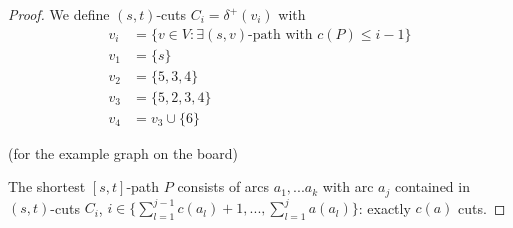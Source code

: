 \begin{proof}
	We define $(s, t)$-cuts $C_i = \delta^+(v_i)$ with
	\begin{align*}
		v_i & = \{v \in V: \exists \text{$(s,v)$-path with $c(P)\leq i-1$}\} \\
		v_1 & = \{s\} \\
		v_2 & = \{5,3,4\} \\
		v_3 & = \{5,2,3,4\} \\
		v_4 & = v_3 \cup \{ 6 \}
	\end{align*}
	
	(for the example graph on the board)
	
	The shortest $[s,t]$-path $P$ consists of arcs $a_1, ... a_k$ with arc $a_j$ contained in $(s,t)$-cuts $C_i$,  $i \in \{\sum_{l=1}^{j-1} c(a_l) + 1, ..., \sum_{l=1}^j a(a_l)\}$: exactly $c(a)$ cuts.
\end{proof}	
